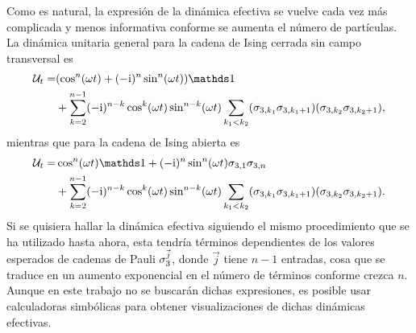 Como es natural, la expresión de la dinámica efectiva se vuelve cada vez más complicada y menos informativa conforme se aumenta el número de partículas. La dinámica unitaria general para la cadena de Ising cerrada sin campo transversal es
\begin{align}
    \mcU_{t}=&\qty(\cos^{n}(\omega t)+(-\rmi)^{n}\sin^{n}(\omega t))\Id\nonumber\\ 
    &+\sum_{k=2}^{n-1}(-\rmi)^{n-k}\cos^{k}(\omega t)\sin^{n-k}(\omega t)\sum_{k_{1}<k_{2}}(\pauli{3,k_{1}}\pauli{3,k_{1}+1})(\pauli{3,k_{2}}\pauli{3,k_{2}+1}),\nonumber
\end{align}
mientras que para la cadena de Ising abierta es
\begin{align}
    \mcU_{t}=&\cos^{n}(\omega t)\Id+(-\rmi)^{n}\sin^{n}(\omega t)\pauli{3,1}\pauli{3,n}\nonumber\\ 
    &+\sum_{k=2}^{n-1}(-\rmi)^{n-k}\cos^{k}(\omega t)\sin^{n-k}(\omega t)\sum_{k_{1}<k_{2}}(\pauli{3,k_{1}}\pauli{3,k_{1}+1})(\pauli{3,k_{2}}\pauli{3,k_{2}+1}).\nonumber
\end{align}
Si se quisiera hallar la dinámica efectiva siguiendo el mismo procedimiento que se ha utilizado hasta ahora, esta tendría términos dependientes de los valores esperados de cadenas de Pauli $\sigma_{3}^{\vec{j}}$, donde $\vec{j}$ tiene $n-1$ entradas, cosa que se traduce en un aumento exponencial en el número de términos conforme crezca $n$. Aunque en este trabajo no se buscarán dichas expresiones, es posible usar calculadoras simbólicas para obtener visualizaciones de dichas dinámicas efectivas. 

